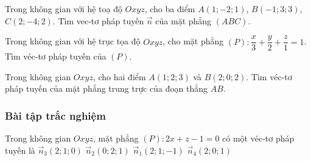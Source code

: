 \begin{vd}%
	
	Trong không gian với hệ toạ độ $Oxyz$, cho ba điểm $A\left( 1;-2;1 \right)$, $B\left( -1;3;3 \right)$, $C\left( 2;-4;2 \right)$. Tìm  vec-tơ pháp tuyến $\overrightarrow{n}$ của mặt phẳng $\left( ABC \right)$.
\end{vd}
\begin{vd}%
	Trong không gian với hệ trục tọa độ $Oxyz$, cho mặt phẳng $(P) \colon \dfrac{x}{3} + \dfrac{y}{2} + \dfrac{z}{1}=1$. Tìm véc-tơ pháp tuyến của $(P)$.
	
\end{vd}
\begin{vd}%
	Trong không gian $Oxyz$, cho hai điểm $A(1;2;3)$ và $B(2;0;2)$. Tìm  véc-tơ pháp tuyến  của mặt phẳng trung trực của đoạn thẳng $AB$.
	
\end{vd}

\subsubsection{Bài tập trắc nghiệm}
\begin{ex}%
	Trong không gian $Oxyz$, mặt phẳng $(P)\colon 2x + z - 1 = 0$ có một véc-tơ pháp tuyến là
	\choice
	{$ \overrightarrow{n}_{3} (2;1;0) $}
	{$ \overrightarrow{n}_{2} (0;2;1) $}
	{$ \overrightarrow{n}_{1} (2;1;-1) $}
	{\True $ \overrightarrow{n}_{4} (2;0;1) $}
\end{ex}

